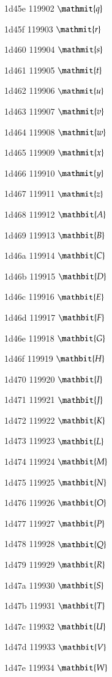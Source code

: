 \documentclass[11pt]{article}
\begin{document}
1d45e 119902 \ensuremath{\mathmit{q}}

1d45f 119903 \ensuremath{\mathmit{r}}

1d460 119904 \ensuremath{\mathmit{s}}

1d461 119905 \ensuremath{\mathmit{t}}

1d462 119906 \ensuremath{\mathmit{u}}

1d463 119907 \ensuremath{\mathmit{v}}

1d464 119908 \ensuremath{\mathmit{w}}

1d465 119909 \ensuremath{\mathmit{x}}

1d466 119910 \ensuremath{\mathmit{y}}

1d467 119911 \ensuremath{\mathmit{z}}

1d468 119912 \ensuremath{\mathbit{A}}

1d469 119913 \ensuremath{\mathbit{B}}

1d46a 119914 \ensuremath{\mathbit{C}}

1d46b 119915 \ensuremath{\mathbit{D}}

1d46c 119916 \ensuremath{\mathbit{E}}

1d46d 119917 \ensuremath{\mathbit{F}}

1d46e 119918 \ensuremath{\mathbit{G}}

1d46f 119919 \ensuremath{\mathbit{H}}

1d470 119920 \ensuremath{\mathbit{I}}

1d471 119921 \ensuremath{\mathbit{J}}

1d472 119922 \ensuremath{\mathbit{K}}

1d473 119923 \ensuremath{\mathbit{L}}

1d474 119924 \ensuremath{\mathbit{M}}

1d475 119925 \ensuremath{\mathbit{N}}

1d476 119926 \ensuremath{\mathbit{O}}

1d477 119927 \ensuremath{\mathbit{P}}

1d478 119928 \ensuremath{\mathbit{Q}}

1d479 119929 \ensuremath{\mathbit{R}}

1d47a 119930 \ensuremath{\mathbit{S}}

1d47b 119931 \ensuremath{\mathbit{T}}

1d47c 119932 \ensuremath{\mathbit{U}}

1d47d 119933 \ensuremath{\mathbit{V}}

1d47e 119934 \ensuremath{\mathbit{W}}
\end{document}
